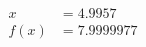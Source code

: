 \documentclass[preview]{standalone}
\begin{document}
\begin{align*}
x &= 4.9957\\f(x) &= 7.9999977
\end{align*}
\end{document}
